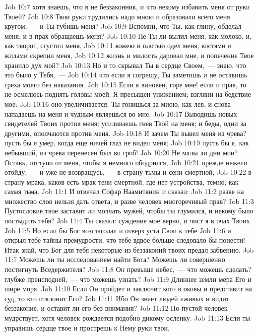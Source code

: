 \vs Job 10:7 хотя знаешь, что я не беззаконник, и что некому избавить меня от руки Твоей?
\vs Job 10:8 Твои руки трудились надо мною и образовали всего меня кругом,~--- и Ты губишь меня?
\vs Job 10:9 Вспомни, что Ты, как глину, обделал меня, и в прах обращаешь меня?
\vs Job 10:10 Не Ты ли вылил меня, как молоко, и, как творог, сгустил меня,
\vs Job 10:11 кожею и плотью одел меня, костями и жилами скрепил меня,
\vs Job 10:12 жизнь и милость даровал мне, и попечение Твое хранило дух мой?
\vs Job 10:13 Но и то скрывал Ты в сердце Своем,~--- знаю, что это было у Тебя,~---
\vs Job 10:14 что если я согрешу, Ты заметишь и не оставишь греха моего без наказания.
\vs Job 10:15 Если я виновен, горе мне! если и прав, то не осмелюсь поднять головы моей. Я пресыщен унижением; взгляни на бедствие мое:
\vs Job 10:16 оно увеличивается. Ты гонишься за мною, как лев, и снова нападаешь на меня и чудным являешься во мне.
\vs Job 10:17 Выводишь новых свидетелей Твоих против меня; усиливаешь гнев Твой на меня; и беды, одни за другими, ополчаются против меня.
\vs Job 10:18 И зачем Ты вывел меня из чрева? пусть бы я умер, когда еще ничей глаз не видел меня;
\vs Job 10:19 пусть бы я, как небывший, из чрева перенесен был во гроб!
\vs Job 10:20 Не малы ли дни мои? Оставь, отступи от меня, чтобы я немного ободрился,
\vs Job 10:21 прежде нежели отойду,~--- и уже не возвращусь,~--- в страну тьмы и сени смертной,
\vs Job 10:22 в страну мрака, каков есть мрак тени смертной, где нет устройства,  темно, как самая тьма.
\vs Job 11:1 И отвечал Софар Наамитянин и сказал:
\vs Job 11:2 разве на множество слов нельзя дать ответа, и разве человек многоречивый прав?
\vs Job 11:3 Пустословие твое заставит ли молчать мужей, чтобы ты глумился, и некому было постыдить тебя?
\vs Job 11:4 Ты сказал: суждение мое верно, и чист я в очах Твоих.
\vs Job 11:5 Но если бы Бог возглаголал и отверз уста Свои к тебе
\vs Job 11:6 и открыл тебе тайны премудрости, что тебе вдвое больше следовало бы понести! Итак знай, что Бог для тебя некоторые из беззаконий твоих предал забвению.
\vs Job 11:7 Можешь ли ты исследованием найти Бога? Можешь ли совершенно постигнуть Вседержителя?
\vs Job 11:8 Он превыше небес,~--- что можешь сделать? глубже преисподней,~--- что можешь узнать?
\vs Job 11:9 Длиннее земли мера Его и шире моря.
\vs Job 11:10 Если Он пройдет и заключит кого в оковы и представит на суд, то кто отклонит Его?
\vs Job 11:11 Ибо Он знает людей лживых и видит беззаконие, и оставит ли его без внимания?
\vs Job 11:12 Но пустой человек мудрствует, хотя человек рождается подобно дикому осленку.
\vs Job 11:13 Если ты управишь сердце твое и прострешь к Нему руки твои,
